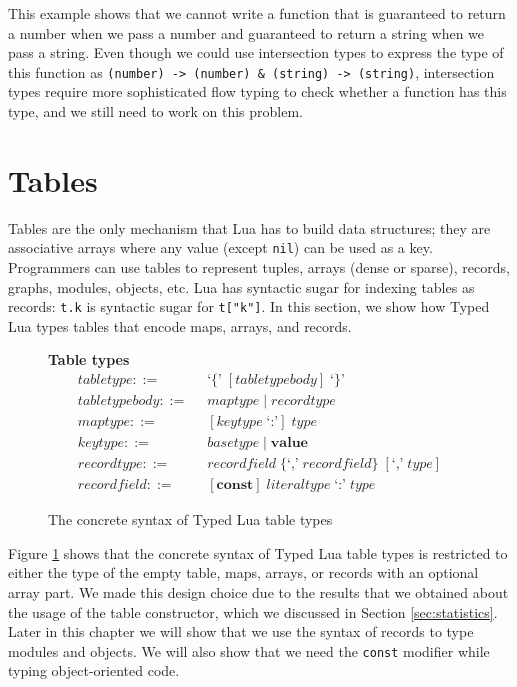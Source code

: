 This example shows that we cannot write a function that is
guaranteed to return a number when we pass a number and
guaranteed to return a string when we pass a string.
Even though we could use intersection types to express the type
of this function as
\texttt{(number) -> (number) \string& (string) -> (string)},
intersection types require more sophisticated flow typing to
check whether a function has this type,
and we still need to work on this problem.

\section{Tables}
\label{sec:tables}

Tables are the only mechanism that Lua has to build data structures;
they are associative arrays where any value (except \texttt{nil})
can be used as a key.
Programmers can use tables to represent tuples, arrays (dense or sparse),
records, graphs, modules, objects, etc.
Lua has syntactic sugar for indexing tables as records:
\texttt{t.k} is syntactic sugar for \texttt{t["k"]}.
In this section, we show how Typed Lua types tables that encode maps,
arrays, and records.

\begin{figure}[!ht]
\textbf{Table types}\\
\dstart
\begin{align*}
\textit{tabletype} ::= & \;\; \texttt{`\{'} \; [\textit{tabletypebody}] \; \texttt{`\}'}\\
\textit{tabletypebody} ::= & \;\; \textit{maptype} \; | \;
  \textit{recordtype}\\
\textit{maptype} ::= & \;\; [\textit{keytype} \; \texttt{`:'}] \; \textit{type}\\
\textit{keytype} ::= & \;\; \textit{basetype} \; | \;
  \textbf{value}\\
\textit{recordtype} ::= & \;\; \textit{recordfield} \; \{\texttt{`,'} \; \textit{recordfield}\} \; [\texttt{`,'} \; \textit{type}]\\
\textit{recordfield} ::= & \;\; [\textbf{const}] \; \textit{literaltype} \; \texttt{`:'} \; \textit{type}
\end{align*}
\dend
\caption{The concrete syntax of Typed Lua table types}
\label{fig:tables}
\end{figure}

Figure \ref{fig:tables} shows that the concrete syntax of Typed Lua
table types is restricted to either the type of the empty table,
maps, arrays, or records with an optional array part.
We made this design choice due to the results that we obtained
about the usage of the table constructor, which we discussed
in Section \ref{sec:statistics}.
Later in this chapter we will show that we use the syntax of records
to type modules and objects.
We will also show that we need the \texttt{const} modifier while
typing object-oriented code.

